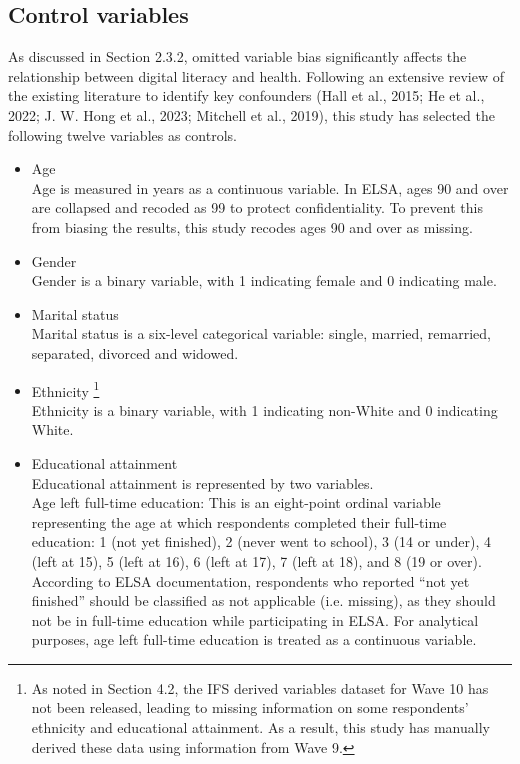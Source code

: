 \subsection{Control variables}
As discussed in Section 2.3.2, omitted variable bias significantly affects the relationship between digital literacy and health. Following an extensive review of the existing literature to identify key confounders (Hall et al., 2015; He et al., 2022; J. W. Hong et al., 2023; Mitchell et al., 2019), this study has selected the following twelve variables as controls.

\begin{itemize}[wide=0pt, leftmargin=*, labelwidth=0pt, labelindent=\parindent, itemindent=0pt]
    \item Age \\
    Age is measured in years as a continuous variable. In ELSA, ages 90 and over are collapsed and recoded as 99 to protect confidentiality. To prevent this from biasing the results, this study recodes ages 90 and over as missing.
    \item Gender \\
    Gender is a binary variable, with 1 indicating female and 0 indicating male.
    \item Marital status \\
    Marital status is a six-level categorical variable: single, married, remarried, separated, divorced and widowed.
    \item Ethnicity \footnote{As noted in Section 4.2, the IFS derived variables dataset for Wave 10 has not been released, leading to missing information on some respondents' ethnicity and educational attainment. As a result, this study has manually derived these data using information from Wave 9.}\label{fn:ifs} \\
    Ethnicity is a binary variable, with 1 indicating non-White and 0 indicating White.
    \item Educational attainment \\
    Educational attainment is represented by two variables. \\
    Age left full-time education: This is an eight-point ordinal variable representing the age at which respondents completed their full-time education: 1 (not yet finished), 2 (never went to school), 3 (14 or under), 4 (left at 15), 5 (left at 16), 6 (left at 17), 7 (left at 18), and 8 (19 or over). According to ELSA documentation, respondents who reported “not yet finished” should be classified as not applicable (i.e. missing), as they should not be in full-time education while participating in ELSA. For analytical purposes, age left full-time education is treated as a continuous variable. \\

\end{itemize}
